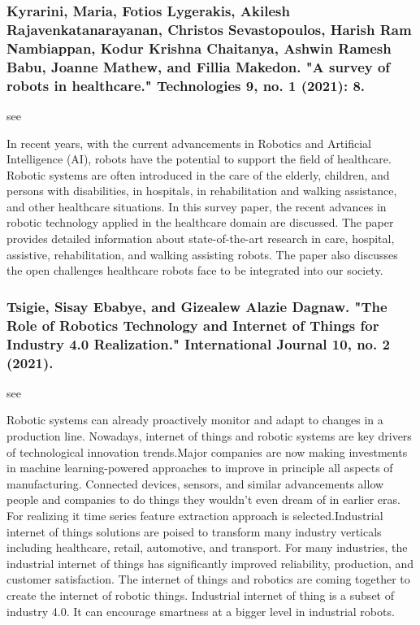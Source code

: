 \documentclass[conference]{IEEEtran}
\begin{document}
\medskip
\subsubsection{Kyrarini, Maria, Fotios Lygerakis, Akilesh Rajavenkatanarayanan, Christos Sevastopoulos, Harish Ram Nambiappan, Kodur Krishna Chaitanya, Ashwin Ramesh Babu, Joanne Mathew, and Fillia Makedon. "A survey of robots in healthcare." Technologies 9, no. 1 (2021): 8.}
see \cite{kyrarini2021survey}

In recent years, with the current advancements in Robotics and Artificial Intelligence (AI), robots have the potential to support the field of healthcare. Robotic systems are often introduced in the care of the elderly, children, and persons with disabilities, in hospitals, in rehabilitation and walking assistance, and other healthcare situations. In this survey paper, the recent advances in robotic technology applied in the healthcare domain are discussed. The paper provides detailed information about state-of-the-art research in care, hospital, assistive, rehabilitation, and walking assisting robots. The paper also discusses the open challenges healthcare robots face to be integrated into our society.

\medskip
\subsubsection{Tsigie, Sisay Ebabye, and Gizealew Alazie Dagnaw. "The Role of Robotics Technology and Internet of Things for Industry 4.0 Realization." International Journal 10, no. 2 (2021).}
see \cite{tsigie2021role}

Robotic systems can already proactively monitor and adapt to changes in a production line. Nowadays, internet of things and robotic systems are key drivers of technological innovation trends.Major companies are now making investments in machine learning-powered approaches to improve in principle all aspects of manufacturing. Connected devices, sensors, and similar advancements allow people and companies to do things they wouldn't even dream of in earlier eras. For realizing it time series feature extraction approach is selected.Industrial internet of things solutions are poised to transform many industry verticals including healthcare, retail, automotive, and transport. For many industries, the industrial internet of things has significantly improved reliability, production, and customer satisfaction. The internet of things and robotics are coming together to create the internet of robotic things. Industrial internet of thing is a subset of industry 4.0. It can encourage smartness at a bigger level in industrial robots.
\end{document}
